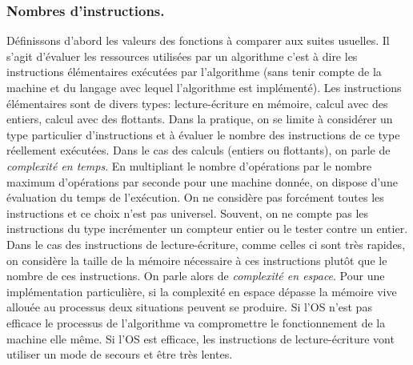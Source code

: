 \subsubsection{Nombres d'instructions.}
Définissons d'abord les valeurs des fonctions à comparer aux suites usuelles.\newline
Il s'agit d'évaluer les ressources utilisées par un algorithme c'est à dire les instructions élémentaires exécutées par l'algorithme (sans tenir compte de la machine et du langage avec lequel l'algorithme est implémenté).\newline
Les instructions élémentaires sont de divers types: lecture-écriture en mémoire, calcul avec des entiers, calcul avec des flottants.
Dans la pratique, on se limite à considérer un type particulier d'instructions et à évaluer le nombre des instructions de ce type réellement exécutées.\newline
Dans le cas des calculs (entiers ou flottants), on parle de \emph{complexité en temps}. En multipliant le nombre d'opérations par le nombre maximum d'opérations par seconde pour une machine donnée, on dispose d'une évaluation du temps de l'exécution. On ne considère pas forcément toutes les instructions et ce choix n'est pas universel. Souvent, on ne compte pas les instructions du type incrémenter un compteur entier ou le tester contre un entier.\newline
Dans le cas des instructions de lecture-écriture, comme celles ci sont très rapides, on considère la taille de la mémoire nécessaire à ces instructions plutôt que le nombre de ces instructions. On parle alors de \emph{complexité en espace}. Pour une implémentation particulière, si la complexité en espace dépasse la mémoire vive allouée au processus deux situations peuvent se produire. Si l'OS n'est pas efficace le processus de l'algorithme va compromettre le fonctionnement de la machine elle même. Si l'OS est efficace, les instructions de lecture-écriture vont utiliser un mode de secours et être très lentes.

